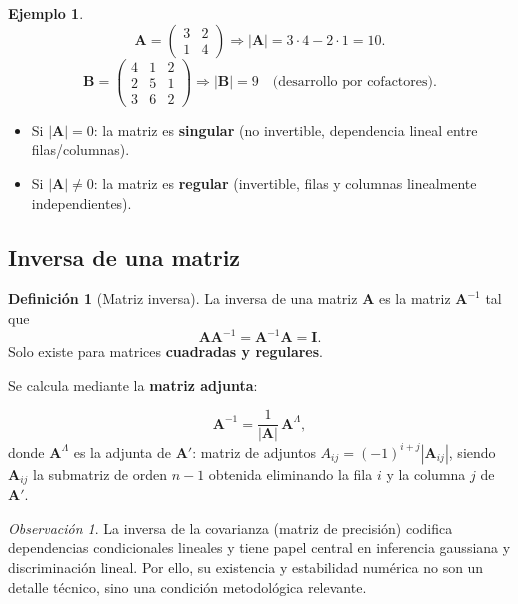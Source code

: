 \documentclass[12pt, a4paper]{article}
\theoremstyle{plain}
\theoremstyle{definition}
\newtheorem{definicion}[teorema]{Definición}
\newtheorem{ejemplo}{Ejemplo}[section]
\theoremstyle{remark}
\newtheorem*{observacion}{Observación}
\newcommand{\mat}[1]{\mathbf{#1}}
\begin{document}
\begin{ejemplo}
\[
  \mat{A} = \begin{pmatrix}3&2\\1&4\end{pmatrix} \Rightarrow
  |\mat{A}| = 3\cdot4 - 2\cdot1 = 10.
\]
\[
  \mat{B} = \begin{pmatrix}4&1&2\\2&5&1\\3&6&2\end{pmatrix} \Rightarrow
  |\mat{B}| = 9 \quad \text{(desarrollo por cofactores)}.
\]
\end{ejemplo}

\begin{mdframed}[style=resultado]
\begin{itemize}
  \item Si $|\mat{A}| = 0$: la matriz es \textbf{singular} (no invertible,
        dependencia lineal entre filas/columnas).
  \item Si $|\mat{A}| \neq 0$: la matriz es \textbf{regular} (invertible,
        filas y columnas linealmente independientes).
\end{itemize}
\end{mdframed}

\subsection{Inversa de una matriz}

\begin{definicion}[Matriz inversa]
La inversa de una matriz $\mat{A}$ es la matriz $\mat{A}^{-1}$ tal que
\[
  \mat{A}\mat{A}^{-1} = \mat{A}^{-1}\mat{A} = \mat{I}.
\]
Solo existe para matrices \textbf{cuadradas y regulares}.
\end{definicion}

Se calcula mediante la \textbf{matriz adjunta}:

\begin{mdframed}[style=resultado]
\[
  \mat{A}^{-1} = \frac{1}{|\mat{A}|}\,\mat{A}^\Lambda,
\]
donde $\mat{A}^\Lambda$ es la adjunta de $\mat{A}'$: matriz de adjuntos
$A_{ij} = (-1)^{i+j}|\mat{A}_{ij}|$, siendo $\mat{A}_{ij}$ la submatriz de
orden $n-1$ obtenida eliminando la fila $i$ y la columna $j$ de $\mat{A}'$.
\end{mdframed}

\begin{observacion}
La inversa de la covarianza (matriz de precisión) codifica dependencias
condicionales lineales y tiene papel central en inferencia gaussiana y
discriminación lineal. Por ello, su existencia y estabilidad numérica no son un
detalle técnico, sino una condición metodológica relevante.
\end{observacion}
\end{document}
